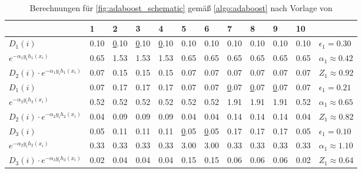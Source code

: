 \begin{table}[H]
    \caption[Berechnungen für \autoref{fig:adaboost_schematic}]{Berechnungen für \autoref{fig:adaboost_schematic} gemäß \autoref{algo:adaboost} nach Vorlage von \textcite[Tabelle 1.1][S.~9]{SchapireFreund2012}}
    \label{tab:adaboost_schematic}
    \begin{tabular}{l|llllllllll|l}
    \hline
                                                  & 1    & 2          & 3          & 4          & 5          & 6          & 7          & 8          & 9          & 10   &                             \\ \hline
    \( D_1(i) \)                                  & 0.10 & {\ul 0.10} & {\ul 0.10} & {\ul 0.10} & 0.10       & 0.10       & 0.10       & 0.10       & 0.10       & 0.10 & \( \epsilon_1 = 0.30 \)     \\
    \( e^{-\alpha_1 y_i h_1(x_i)} \)              & 0.65 & 1.53       & 1.53       & 1.53       & 0.65       & 0.65       & 0.65       & 0.65       & 0.65       & 0.65 & \( \alpha_1 \approx 0.42 \) \\
    \( D_2(i) \cdot e^{-\alpha_1 y_i h_1(x_i)} \) & 0.07 & 0.15       & 0.15       & 0.15       & 0.07       & 0.07       & 0.07       & 0.07       & 0.07       & 0.07 & \( Z_1 \approx 0.92 \)      \\ \hline
    \( D_1(i) \)                                  & 0.07 & 0.17       & 0.17       & 0.17       & 0.07       & 0.07       & {\ul 0.07} & {\ul 0.07} & {\ul 0.07} & 0.07 & \( \epsilon_1 = 0.21 \)     \\
    \( e^{-\alpha_2 y_i h_2(x_i)} \)              & 0.52 & 0.52       & 0.52       & 0.52       & 0.52       & 0.52       & 1.91       & 1.91       & 1.91       & 0.52 & \( \alpha_1 \approx 0.65 \) \\
    \( D_2(i) \cdot e^{-\alpha_2 y_i h_2(x_i)} \) & 0.04 & 0.09       & 0.09       & 0.09       & 0.04       & 0.04       & 0.14       & 0.14       & 0.14       & 0.04 & \( Z_1 \approx 0.82 \)      \\ \hline
    \( D_3(i) \)                                  & 0.05 & 0.11       & 0.11       & 0.11       & {\ul 0.05} & {\ul 0.05} & 0.17       & 0.17       & 0.17       & 0.05 & \( \epsilon_1 = 0.10 \)     \\
    \( e^{-\alpha_2 y_i h_2(x_i)} \)              & 0.33 & 0.33       & 0.33       & 0.33       & 3.00       & 3.00       & 0.33       & 0.33       & 0.33       & 0.33 & \( \alpha_1 \approx 1.10 \) \\
    \( D_3(i) \cdot e^{-\alpha_3 y_i h_3(x_i)} \) & 0.02 & 0.04       & 0.04       & 0.04       & 0.15       & 0.15       & 0.06       & 0.06       & 0.06       & 0.02 & \( Z_1 \approx 0.64 \)      \\ \hline
    \end{tabular}
\end{table}

